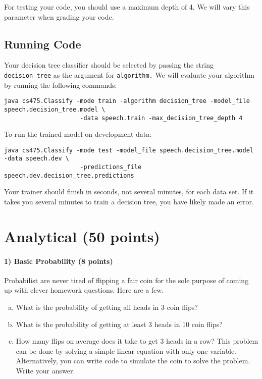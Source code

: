 \documentclass[11pt]{article}
\begin{document}
For testing your code, you should use a maximum depth of 4. We will vary this parameter when grading your code.
 
\subsection{Running Code}
Your decision tree classifier should be selected by passing the string {\tt decision\_tree} as the argument for {\tt algorithm.} We will evaluate your algorithm by running the following commands:
\begin{footnotesize}
\begin{verbatim}
java cs475.Classify -mode train -algorithm decision_tree -model_file speech.decision_tree.model \
                     -data speech.train -max_decision_tree_depth 4
\end{verbatim}
\end{footnotesize}
To run the trained model on development data:
\begin{footnotesize}
\begin{verbatim}
java cs475.Classify -mode test -model_file speech.decision_tree.model -data speech.dev \
                     -predictions_file speech.dev.decision_tree.predictions
\end{verbatim}
\end{footnotesize}

Your trainer should finish in seconds, not several minutes, for each data set. If it takes you several minutes
to train a decision tree, you have likely made an error. 

\section{Analytical (50 points)}

\paragraph{1) Basic Probability (8 points)}
Probabilist are never tired of flipping a fair coin for the sole purpose of coming up with clever homework questions. Here are a few.
\begin{enumerate}[(a)]
\item What is the probability of getting all heads in 3 coin flips?
\item What is the probability of getting at least 3 heads in 10 coin flips?
\item How many flips on average does it take to get 3 heads in a row? This problem can be done by solving a simple linear equation with only one variable. Alternatively, you can write code to simulate the coin to solve the problem. Write your answer.
\end{enumerate}
\end{document}
